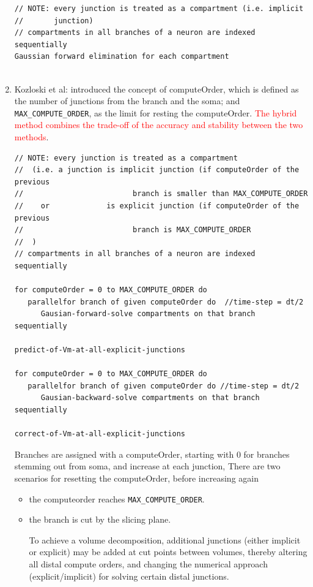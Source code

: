\begin{enumerate}
\begin{verbatim}
// NOTE: every junction is treated as a compartment (i.e. implicit
//       junction)
// compartments in all branches of a neuron are indexed sequentially
Gaussian forward elimination for each compartment 
  
\end{verbatim}  
   
   
   \item Kozloski et al: introduced the concept of computeOrder, which is defined as the
   number of junctions from the branch and the soma;
   and \verb!MAX_COMPUTE_ORDER!, as the limit for resting the computeOrder.
    \textcolor{red}{The hybrid method combines the trade-off of
    the accuracy and stability between the two methods}.
      
 \begin{verbatim}
// NOTE: every junction is treated as a compartment 
//  (i.e. a junction is implicit junction (if computeOrder of the previous
//                         branch is smaller than MAX_COMPUTE_ORDER
//    or             is explicit junction (if computeOrder of the previous
//                         branch is MAX_COMPUTE_ORDER
//  )
// compartments in all branches of a neuron are indexed sequentially

for computeOrder = 0 to MAX_COMPUTE_ORDER do
   parallelfor branch of given computeOrder do  //time-step = dt/2 
      Gausian-forward-solve compartments on that branch sequentially
   
predict-of-Vm-at-all-explicit-junctions

for computeOrder = 0 to MAX_COMPUTE_ORDER do
   parallelfor branch of given computeOrder do //time-step = dt/2
      Gausian-backward-solve compartments on that branch sequentially

correct-of-Vm-at-all-explicit-junctions   
\end{verbatim}
      
   
   Branches are assigned with a computeOrder, starting with 0 for branches
   stemming out from soma, and increase at each junction, There are two
   scenarios for resetting the computeOrder, before increasing again
   \begin{itemize}
     \item the computeorder reaches \verb!MAX_COMPUTE_ORDER!.
     
     \item the branch is cut by the slicing plane.
     
     To achieve a volume decomposition, additional junctions (either implicit or
     explicit) may be added at cut points between volumes, thereby altering all
     distal compute orders, and changing the numerical approach
     (explicit/implicit) for solving certain distal junctions.
     

\end{itemize}
\end{enumerate}
